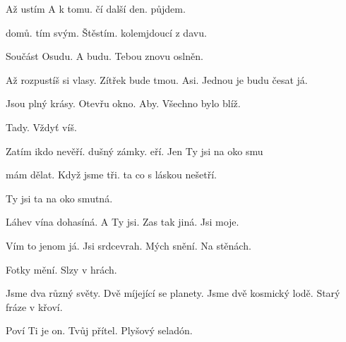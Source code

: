 

\zs
Až ustím  A k tomu.
čí další den.  půjdem.

 domů.  tím svým. 
Štěstím.  kolemjdoucí z davu.

Součást Osudu. A budu.
Tebou znovu oslněn.
\ks

\zs
Až rozpustíš si vlasy. Zítřek bude tmou.
Asi. Jednou je budu česat já.

Jsou plný krásy. Otevřu okno.
Aby. Všechno bylo blíž.

Tady. Vždyť víš.
\ks


\zr \kr

\zs
Zatím ikdo nevěří. dušný zámky.
eří. Jen Ty jsi na oko smu

 mám dělat. Když jsme tři.  ta co s láskou nešetří. 

Ty jsi ta na oko smutná.
\ks

\zs
Láhev vína dohasíná. A Ty jsi.
Zas tak jiná. Jsi moje.

Vím to jenom já. Jsi srdcevrah.
Mých snění. Na stěnách.

Fotky mění. Slzy v hrách.

\ks

\zr \kr

\zs
Jsme dva různý světy. Dvě míjející se planety.
Jsme dvě kosmický lodě. Starý fráze v křoví.

Poví Ti je on. Tvůj přítel.
Plyšový seladón.
\ks


\zr \kr

\kp





